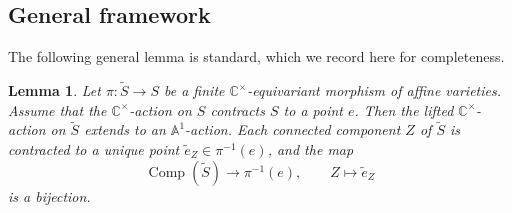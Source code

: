 \documentclass{amsart}
\newtheorem{corollary}[theorem]{Corollary}
\newtheorem{lemma}[theorem]{Lemma}
\theoremstyle{definition}
\newtheorem{remark}[theorem]{Remark}
\newcommand{\A}{\mathbb{A}}
\newcommand{\C}{\mathbb{C}}
\newcommand{\F}{\mathbb{F}}
\newcommand{\g}{\mathfrak{g}}
\newcommand{\Ab}{\bar{A}}
\newcommand{\0}{\mathcal{O}}
\begin{document}






\subsection{General framework}\label{subsec:framework}


The following general lemma is standard, which we record here for completeness.

\begin{lemma}\label{lem:lifted-slice-contraction}
	Let $\pi:\widetilde S\to S$ be a finite $\C^\times$-equivariant morphism of affine varieties. Assume that the $\C^\times$-action on $S$ contracts $S$ to a point $e$. Then the lifted $\C^\times$-action on $\widetilde S$ extends to an $\A^1$-action. Each connected component $Z$ of $\widetilde S$ is contracted to a unique point $\tilde e_Z\in \pi^{-1}(e)$, and the map
	\[
		\operatorname{Comp}(\widetilde S) \to \pi^{-1}(e),\qquad Z \mapsto \tilde e_Z
	\]
	is a bijection.
	\end{lemma}
	
\end{document}
